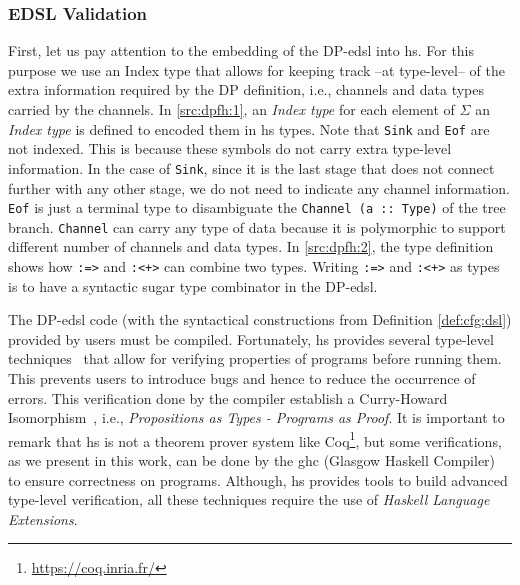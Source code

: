\subsubsection{EDSL Validation}\label{sub:sec:dsl-val}
First, let us pay attention to the embedding of the DP-\acrshort{edsl} into \acrshort{hs}. For this purpose we use an Index type \cite{type-index} that allows for keeping track –at type-level– of the extra information required by the DP definition, i.e., channels and data types carried by the channels. In \autoref{src:dpfh:1}, an \emph{Index type} for each element of $\Sigma$ an \emph{Index type} is defined to encoded them in \acrshort{hs} types. Note that  \texttt{Sink} and  \texttt{Eof} are not indexed. This is because these symbols do not carry extra type-level information. In the case of \texttt{Sink}, since it is the last stage that does not connect further with any other stage, we do not need to indicate any channel information.  \texttt{Eof} is just a terminal type to disambiguate the \texttt{Channel (a :: Type)} of the tree branch. \texttt{Channel} can carry any type of data because it is polymorphic to support different number of channels and data types. 
In \autoref{src:dpfh:2}, the type definition shows how \texttt{:=>} and \texttt{:<+>} can combine two types.  Writing \texttt{:=>} and \texttt{:<+>} as types is to have a syntactic sugar type combinator in the DP-\acrshort{edsl}. 

The DP-\acrshort{edsl} code (with the syntactical constructions from Definition \ref{def:cfg:dsl}) provided by users must be compiled. Fortunately, \acrshort{hs} provides several type-level techniques~\cite{type-haskell} that allow for verifying properties of programs before running them. This prevents users to introduce bugs and hence to reduce the occurrence of  errors. This verification done by the compiler establish a Curry-Howard Isomorphism~\cite{curryhoward}, i.e., \emph{Propositions as Types - Programs as Proof}. It is important to remark that \acrshort{hs} is not a theorem prover system like Coq\footnote{\url{https://coq.inria.fr/}}, but some verifications, as we present in this work, can be done by the \acrshort{ghc} (Glasgow Haskell Compiler) to ensure correctness on programs.
Although, \acrshort{hs} provides tools to build advanced type-level verification, all these techniques require the use  of \emph{Haskell Language Extensions}.


